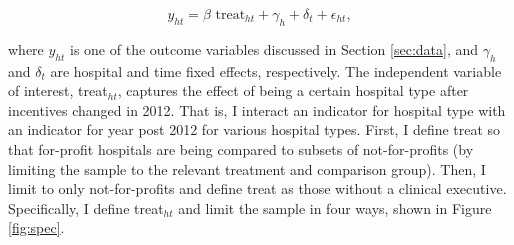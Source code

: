 \documentclass[12pt]{article}
\begin{document}
    \begin{equation}
    \label{eq:forprofit}
    y_{ht} = \beta \text{ treat}_{ht} + \gamma_{h} + \delta_t + \epsilon_{ht},
    \end{equation}
    

    \noindent where $y_{ht}$ is one of the outcome variables discussed in Section \ref{sec:data}, and $\gamma_h$ and $\delta_t$ are hospital and time fixed effects, respectively. The independent variable of interest, treat$_{ht}$, captures the effect of being a certain hospital type after incentives changed in 2012. That is, I interact an indicator for hospital type with an indicator for year post 2012 for various hospital types. First, I define treat so that for-profit hospitals are being compared to subsets of not-for-profits (by limiting the sample to the relevant treatment and comparison group). Then, I limit to only not-for-profits and define treat as those without a clinical executive. Specifically, I define treat$_{ht}$ and limit the sample in four ways, shown in Figure \ref{fig:spec}. 
\end{document}
